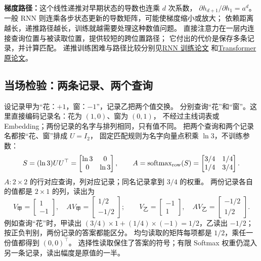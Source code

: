 \textbf{梯度路径：}这个线性递推对早期状态的导数也连乘 $d$ 次系数，
$\partial h_{d+1}/\partial h_1=a^d$。
一般 RNN 则连乘各步状态更新的导数矩阵，可能使梯度缩小或放大；
依赖距离越长，递推路径越长，训练就越需要处理这种数值问题。
直接注意力在一层内连接查询位置与被读取位置，提供较短的跨位置路径；
它付出的代价是保存多条记录，并计算匹配。
递推训练困难与路径比较分别见\hyperref[source:rnn-training]{RNN 训练论文}
和\hyperref[source:attention-original]{Transformer 原论文}。

\subsection{当场检验：两条记录、两个查询}
\label{experiment:record-query-handcalc}

设记录甲为“花：$+1$，窗：$-1$”，记录乙把两个值交换。
分别查询“花”和“窗”。这里直接编码记录名：花为 $(1,0)$、窗为 $(0,1)$，
不经过主线词表或 Embedding；两份记录的名字与排列相同，只有值不同。
把两个查询和两个记录名都按“花、窗”排成 $U=I_2$，
固定匹配规则为名字向量点积乘 $\ln3$，不训练参数：
\[
S=(\ln3)UU^\top=\begin{bmatrix}\ln3&0\\0&\ln3\end{bmatrix},\qquad
A=\operatorname{softmax}_{\rm row}(S)=\begin{bmatrix}3/4&1/4\\1/4&3/4\end{bmatrix}.
\]
$A:2\times2$ 的行对应查询，列对应记录；同名记录拿到 $3/4$ 的权重。
两份记录各自的值都是 $2\times1$ 的列，读出为
\[
V_{\text{甲}}=\begin{bmatrix}1\\-1\end{bmatrix},\quad
AV_{\text{甲}}=\begin{bmatrix}1/2\\-1/2\end{bmatrix};\qquad
V_{\text{乙}}=\begin{bmatrix}-1\\1\end{bmatrix},\quad
AV_{\text{乙}}=\begin{bmatrix}-1/2\\1/2\end{bmatrix}.
\]
例如查询“花”时，甲读出 $(3/4)\times1+(1/4)\times(-1)=1/2$，乙读出 $-1/2$；
按正负判别，两份记录的答案都能区分。
均匀读取的矩阵每项都是 $1/2$，乘任一份值都得到 $(0,0)^\top$。
选择性读取保住了答案的符号；有限 Softmax 权重仍混入另一条记录，读出幅度是原值的一半。

